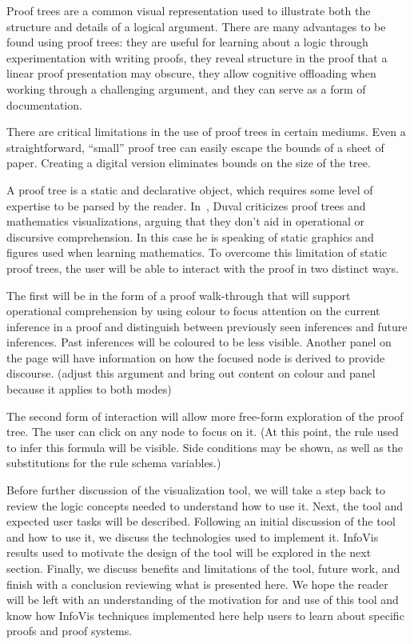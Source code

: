 \documentclass[conference]{IEEEtran}
\begin{document}
Proof trees are a common visual representation used to illustrate both the structure and details of a logical argument. There are many advantages to be found using proof trees: they are useful for learning about a logic through experimentation with writing proofs, they reveal structure in the proof that a linear proof presentation may obscure, they allow cognitive offloading when working through a challenging argument, and they can serve as a form of documentation.

There are critical limitations in the use of proof trees in certain mediums. Even a straightforward, ``small'' proof tree can easily escape the bounds of a sheet of paper. Creating a digital version eliminates bounds on the size of the tree.

A proof tree is a static and declarative object, which requires some level of expertise to be parsed by the reader. In~\cite{repvisvis-duval}, Duval criticizes proof trees and mathematics visualizations, arguing that they don’t aid in operational or discursive comprehension. In this case he is speaking of static graphics and figures used when learning mathematics. To overcome this limitation of static proof trees, the user will be able to interact with the proof in two distinct ways.

The first will be in the form of a proof walk-through that will support operational comprehension by using colour to focus attention on the current inference in a proof and distinguish between previously seen inferences and future inferences. Past inferences will be coloured to be less visible. Another panel on the page will have information on how the focused node is derived to provide discourse. (adjust this argument and bring out content on colour and panel because it applies to both modes)

The second form of interaction will allow more free-form exploration of the proof tree. The user can click on any node to focus on it. (At this point, the rule used to infer this formula will be visible. Side conditions may be shown, as well as the substitutions for the rule schema variables.)

Before further discussion of the visualization tool, we will take a step back to review the logic concepts needed to understand how to use it. Next, the tool and expected user tasks will be described. Following an initial discussion of the tool and how to use it, we discuss the technologies used to implement it. InfoVis results used to motivate the design of the tool will be explored in the next section. Finally, we discuss benefits and limitations of the tool, future work, and finish with a conclusion reviewing what is presented here. We hope the reader will be left with an understanding of the motivation for and use of this tool and know how InfoVis techniques implemented here help users to learn about specific proofs and proof systems.
\end{document}
